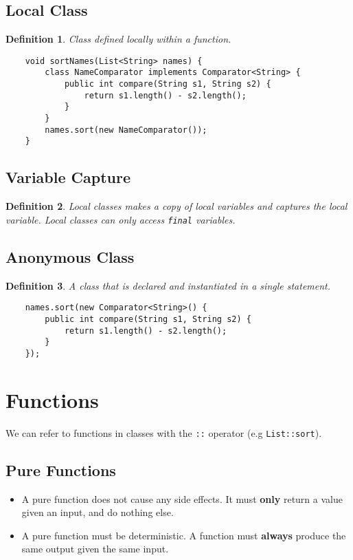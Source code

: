\documentclass[10pt,landscape,a4paper]{article}
\newtheorem{definition}{Definition}[section]
\begin{document}
\begin{multicols*}{4}
\subsection{Local Class}
\begin{definition}
    Class defined locally within a function.
\end{definition}

\begin{lstlisting}
    void sortNames(List<String> names) {
        class NameComparator implements Comparator<String> {
            public int compare(String s1, String s2) {
                return s1.length() - s2.length();
            }
        }
        names.sort(new NameComparator());
    }
\end{lstlisting}

\subsection{Variable Capture}
\begin{definition}
    Local classes makes a copy of local variables and captures the local variable. Local classes can only access \texttt{final} variables.
\end{definition}

\subsection{Anonymous Class}
\begin{definition}
    A class that is declared and instantiated in a single statement.
\end{definition}

\begin{lstlisting}
    names.sort(new Comparator<String>() {
        public int compare(String s1, String s2) {
            return s1.length() - s2.length();
        }
    });
\end{lstlisting}

\section{Functions}
We can refer to functions in classes with the \texttt{::} operator (e.g \texttt{List::sort}).
\subsection{Pure Functions}
\begin{itemize}
    \item A pure function does not cause any side effects. It must \textbf{only} return a value given an input, and do nothing else.
    \item A pure function must be deterministic. A function must \textbf{always} produce the same output given the same input.
\end{itemize}


\end{multicols*}
\end{document}
